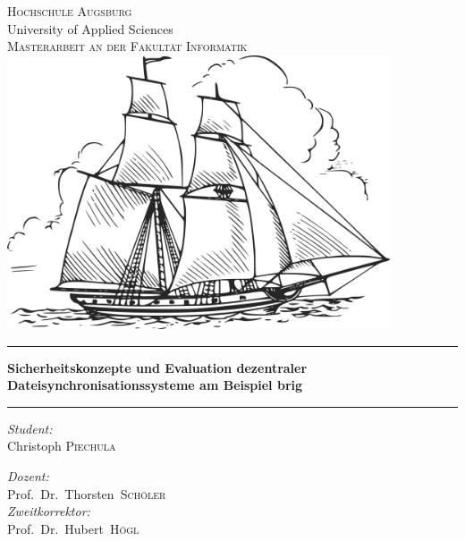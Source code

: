 \begin{titlepage}
\pagecolor{titlepagecolor}
\begin{center}

\color{titlepagefontcolor}
\textsc{\huge Hochschule Augsburg}\\[0.2cm]
\large University of Applied Sciences\\[1cm]
\textsc{\LARGE Masterarbeit an der Fakultät Informatik}\\[0.5cm]
\vspace{1em}
\includegraphics[width=0.85\textwidth]{images/title.png}~\\[1cm]

\rule{\linewidth}{0.5mm}

{\vspace{0.1cm}\Huge\bfseries Sicherheitskonzepte und Evaluation dezentraler Dateisynchronisationssysteme am Beispiel \frqq brig\flqq\\[0.3cm]}
\rule{\linewidth}{0.5mm}

\vspace{0.5cm}

\noindent
\begin{minipage}[t]{0.4\textwidth}
\begin{flushleft} \Large
\emph{Student:}\\
\textnormal{Christoph \textsc{Piechula}} \\
\end{flushleft}
\end{minipage}%
\begin{minipage}[t]{0.4\textwidth}
\begin{flushright} \Large
\emph{Dozent:} \\
\textnormal{Prof.\ Dr.\ Thorsten\  \textsc{Schöler}} \\
\vspace{1em}
\emph{Zweitkorrektor:} \\
\textnormal{Prof.\ Dr.\ Hubert\  \textsc{Högl}} \\
\end{flushright}
\end{minipage}


\end{center}
\end{titlepage}
